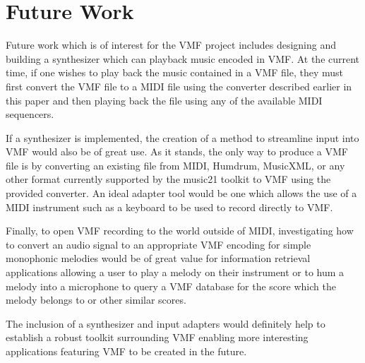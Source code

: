 
\section{Future Work}

Future work which is of interest for the VMF project includes designing and building a synthesizer which can playback music encoded in VMF. At the current time, if one wishes to play back the music contained in a VMF file, they must first convert the VMF file to a MIDI file using the converter described earlier in this paper and then playing back the file using any of the available MIDI sequencers.

If a synthesizer is implemented, the creation of a method to streamline input into VMF would also be of great use. As it stands, the only way to produce a VMF file is by converting an existing file from MIDI, Humdrum, MusicXML, or any other format currently supported by the music21 toolkit to VMF using the provided converter. An ideal adapter tool would be one which allows the use of a MIDI instrument such as a keyboard to be used to record directly to VMF.

Finally, to open VMF recording to the world outside of MIDI, investigating how to convert an audio signal to an appropriate VMF encoding for simple monophonic melodies would be of great value for information retrieval applications allowing a user to play a melody on their instrument or to hum a melody into a microphone to query a VMF database for the score which the melody belongs to or other similar scores.

The inclusion of a synthesizer and input adapters would definitely help to establish a robust toolkit surrounding VMF enabling more interesting applications featuring VMF to be created in the future.